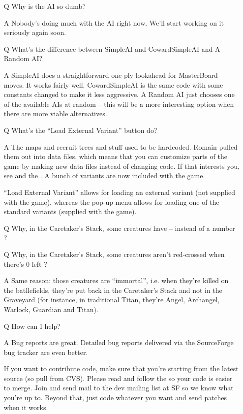 \documentclass{article}
\begin{document}
\begin{itemize}
\item[Q] Why is the AI so dumb?

\item[A] Nobody's doing much with the AI right now.  We'll start working
 on it seriously again soon.


\item[Q] What's the difference between SimpleAI and CowardSimpleAI and
 A Random AI?

\item[A] SimpleAI does a straightforward one-ply lookahead for MasterBoard
 moves. It works fairly well.  CowardSimpleAI is the same code with some
 constants changed to make it less aggressive.  A Random AI just chooses one
 of the available AIs at random -- this will be a more interesting option
 when there are more viable alternatives.


\item[Q] What's the ``Load External Variant'' button do? 

\item[A] The maps and recruit trees and stuff used to be hardcoded. Romain
 pulled them out into data files, which means that you can customize parts 
 of the game by making new data files instead of changing code. If that 
 interests you, see
 and the
 .
 A bunch of variants are now included with the game.

 ``Load External Variant'' allows for loading an external variant
 (not supplied with the game), whereas the pop-up menu allows
 for loading one of the standard variants (supplied with the game).

\item[Q] Why, in the Caretaker's Stack, some creatures have \texttt{--}
 instead of a number ?
\item[Q] Why, in the Caretaker's Stack, some creatures aren't red-crossed
 when there's 0 left ?

\item[A] Same reason: those creatures are ``immortal'', i.e. when they're
 killed on the batllefields, they're put back in the Caretaker's Stack
 and not in the Graveyard (for instance, in traditional Titan, they're
 Angel, Archangel, Warlock, Guardian and Titan).

\item[Q] How can I help?

\item[A] Bug reports are great. Detailed bug reports delivered via the 
 SourceForge bug tracker are even better. 
 
 If you want to contribute code, make sure that you're starting 
 from the latest source (so pull from CVS). Please read and follow
 the 
 so your code is easier to merge. Join and send mail to the dev mailing
 list at SF so we know what you're up to. Beyond that, just code whatever
 you want and send patches when it works.

\end{itemize}
\end{document}
